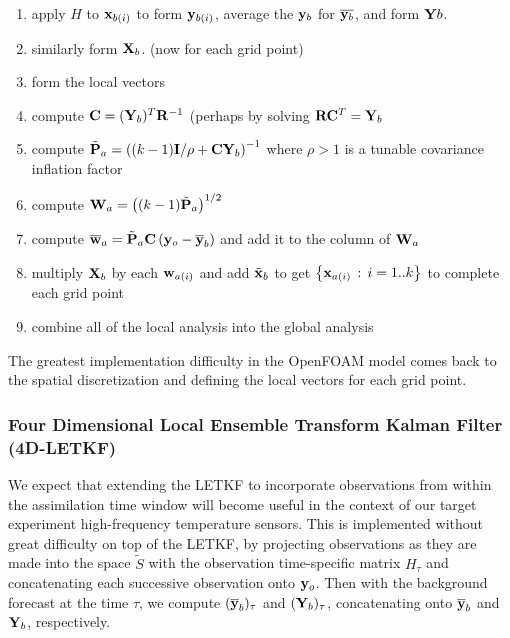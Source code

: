 \begin{enumerate}
\item apply $H$ to $\mathbf{x}_{b(i)}$ to form $\mathbf{y}_{b(i)}$, average the $\mathbf{y}_b$ for $\overline{\mathbf{y}_b}$, and form $\mathbf{Y} b$.
\item similarly form $\mathbf{X}_b$. (now for each grid point)
\item form the local vectors
\item compute $\mathbf{C}=(\mathbf{Y}_b)^T\mathbf{R}^{-1}$ (perhaps by solving $\mathbf{R} \mathbf{C}^T = \mathbf{Y}_b$
\item compute $\tilde{\mathbf{P}}_a = \left( (k-1)\mathbf{I} / \rho + \mathbf{C} \mathbf{Y} _b \right ) ^{-1}$ where $\rho > 1$ is a tunable covariance inflation factor
\item compute $\mathbf{W}_a = \left ( (k-1) \tilde{\mathbf{P}} _a \right ) ^{1/2}$
\item compute $\overline{\mathbf{w}} _a  = \tilde{\mathbf{P}}_a \mathbf{C} \left ( \mathbf{y}_o - \overline{\mathbf{y}} _b \right )$ and add it to the column of $\mathbf{W}_a$
\item multiply $\mathbf{X}_b$ by each $\mathbf{w}_{a(i)}$ and add $\tilde{\mathbf{x}}_b$ to get $\left\{ \mathbf{x}_{a(i)}\,:\,i=1..k\right \}$ to complete each grid point
\item combine all of the local analysis into the global analysis
\end{enumerate}

The greatest implementation difficulty in the OpenFOAM model comes back to the spatial discretization and defining the local vectors for each grid point.

\subsubsection{Four Dimensional Local Ensemble Transform Kalman Filter (4D-LETKF)}

We expect that extending the LETKF to incorporate observations from within the assimilation time window will become useful in the context of our target experiment high-frequency temperature sensors.
This is implemented without great difficulty on top of the LETKF, by projecting observations as they are made into the space $\tilde{S}$ with the observation time-specific matrix $H_\tau$ and concatenating each successive observation onto $\mathbf{y}_o$.
Then with the background forecast at the time $\tau$, we compute $( \overline{\mathbf{y}}_b )_\tau$ and $ (\mathbf{Y} _b ) _\tau$, concatenating onto $\overline{\mathbf{y}}_b$ and $\mathbf{Y}_b$, respectively.


